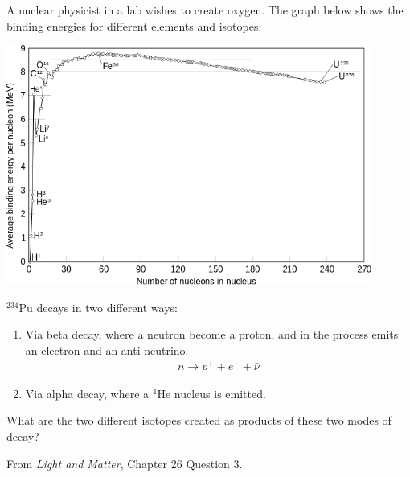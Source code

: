 \documentclass[12pt]{exam}
\begin{document}
\begin{questions}
\clearpage
\question A nuclear physicist in a lab wishes to create oxygen. The graph below shows the binding energies for different elements and isotopes:
\noindent\begin{center}
\includegraphics[width=0.9\textwidth]{../images/bindingEnergies.png}
\end{center}

\question $^{234}$Pu decays in two different ways:
\begin{enumerate}
	\item Via beta decay, where a neutron become a proton, and in the process emits an electron and an anti-neutrino:
	\begin{eqnarray}
	n \rightarrow p^+ + e^- + \bar{\nu} \nonumber
	\end{eqnarray}
	\item Via alpha decay, where a $^4$He nucleus is emitted.
\end{enumerate}
What are the two different isotopes created as products of these two modes of decay?

From \textit{Light and Matter}, Chapter 26 Question 3.
\vspace{0.5in}


\end{questions}
\end{document}
